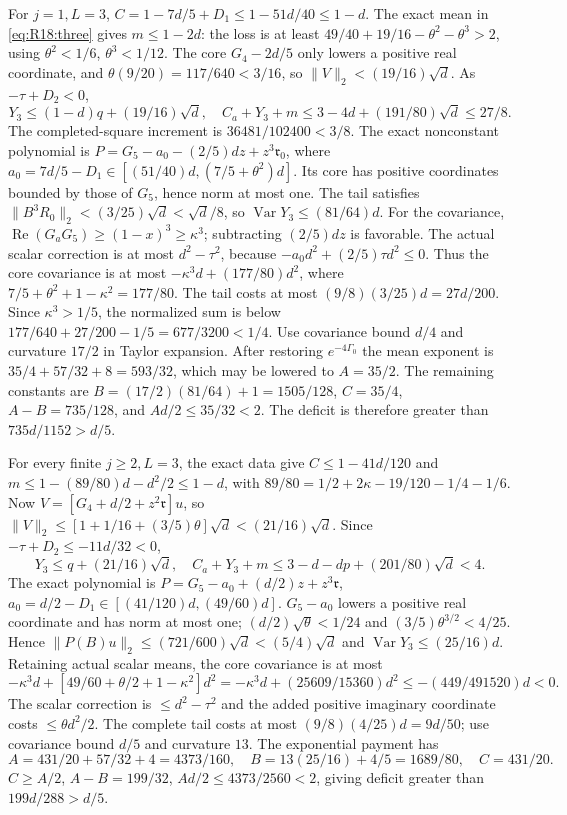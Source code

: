 For $j=1,L=3$, $C=1-7d/5+D_1\le1-51d/40\le1-d$.
The exact mean in \eqref{eq:R18:three} gives $m\le1-2d$:
the loss is at least $49/40+19/16-\theta^2-\theta^3>2$,
using $\theta^2<1/6$, $\theta^3<1/12$.
The core $G_4-2d/5$ only lowers a positive real coordinate, and
$\theta(9/20)=117/640<3/16$, so $\|V\|_2<(19/16)\sqrt d$.
As $-\tau+D_2<0$,
\[
Y_3\le(1-d)q+(19/16)\sqrt d,\quad
C_a+Y_3+m\le3-4d+(191/80)\sqrt d\le27/8.
\]
The completed-square increment is $36481/102400<3/8$.
The exact nonconstant polynomial is
$P=G_5-a_0-(2/5)dz+z^3\mathfrak r_0$,
where $a_0=7d/5-D_1\in[(51/40)d,(7/5+\theta^2)d]$.
Its core has positive coordinates bounded by those of $G_5$, hence
norm at most one. The tail satisfies
$\|B^3R_0\|_2<(3/25)\sqrt d<\sqrt d/8$, so
$\operatorname{Var}Y_3\le(81/64)d$.
For the covariance, $\operatorname{Re}(G_aG_5)\ge(1-x)^3\ge\kappa^3$;
subtracting $(2/5)dz$ is favorable. The actual scalar correction is
at most $d^2-\tau^2$, because
$-a_0d^2+(2/5)\tau d^2\le0$.
Thus the core covariance is at most
$-\kappa^3d+(177/80)d^2$, where
$7/5+\theta^2+1-\kappa^2=177/80$.
The tail costs at most $(9/8)(3/25)d=27d/200$.
Since $\kappa^3>1/5$, the normalized sum is below
$177/640+27/200-1/5=677/3200<1/4$.
Use covariance bound $d/4$ and curvature $17/2$ in Taylor expansion.
After restoring $e^{-4\Gamma_0}$ the mean exponent is
$35/4+57/32+8=593/32$, which may be lowered to $A=35/2$.
The remaining constants are $B=(17/2)(81/64)+1=1505/128$,
$C=35/4$, $A-B=735/128$, and $Ad/2\le35/32<2$.
The deficit is therefore greater than $735d/1152>d/5$.

For every finite $j\ge2,L=3$, the exact data give
$C\le1-41d/120$ and
$m\le1-(89/80)d-d^2/2\le1-d$, with
$89/80=1/2+2\kappa-19/120-1/4-1/6$.
Now $V=[G_4+d/2+z^2\mathfrak r]u$, so
$\|V\|_2\le[1+1/16+(3/5)\theta]\sqrt d<(21/16)\sqrt d$.
Since $-\tau+D_2\le-11d/32<0$,
\[
Y_3\le q+(21/16)\sqrt d,\quad
C_a+Y_3+m\le3-d-dp+(201/80)\sqrt d<4.
\]
The exact polynomial is
$P=G_5-a_0+(d/2)z+z^3\mathfrak r$,
$a_0=d/2-D_1\in[(41/120)d,(49/60)d]$.
$G_5-a_0$ lowers a positive real coordinate and has norm at most one;
$(d/2)\sqrt\theta<1/24$ and $(3/5)\theta^{3/2}<4/25$.
Hence $\|P(B)u\|_2\le(721/600)\sqrt d<(5/4)\sqrt d$ and
$\operatorname{Var}Y_3\le(25/16)d$.
Retaining actual scalar means, the core covariance is at most
\[
-\kappa^3d+[49/60+\theta/2+1-\kappa^2]d^2
=-\kappa^3d+(25609/15360)d^2
\le-(449/491520)d<0.
\]
The scalar correction is $\le d^2-\tau^2$ and the added positive
imaginary coordinate costs $\le\theta d^2/2$.
The complete tail costs at most $(9/8)(4/25)d=9d/50$; use covariance
bound $d/5$ and curvature $13$.
The exponential payment has
\[
A=431/20+57/32+4=4373/160,\quad
B=13(25/16)+4/5=1689/80,\quad C=431/20.
\]
$C\ge A/2$, $A-B=199/32$, $Ad/2\le4373/2560<2$, giving deficit
greater than $199d/288>d/5$.


